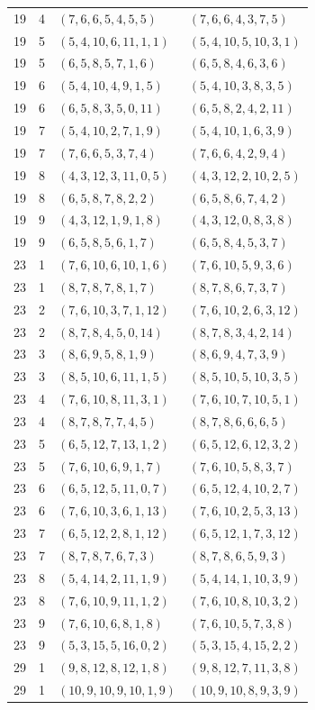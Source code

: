 \documentclass[11pt,a4paper,oneside,openany]{book}
\theoremstyle{definition}
\numberwithin{equation}{chapter}
\begin{document}
\begin{longtable}{rrll}
19&4&$(7,6,6,5,4,5,5)$&$(7,6,6,4,3,7,5)$\\
19&5&$(5,4,10,6,11,1,1)$&$(5,4,10,5,10,3,1)$\\
19&5&$(6,5,8,5,7,1,6)$&$(6,5,8,4,6,3,6)$\\
19&6&$(5,4,10,4,9,1,5)$&$(5,4,10,3,8,3,5)$\\
19&6&$(6,5,8,3,5,0,11)$&$(6,5,8,2,4,2,11)$\\
19&7&$(5,4,10,2,7,1,9)$&$(5,4,10,1,6,3,9)$\\
19&7&$(7,6,6,5,3,7,4)$&$(7,6,6,4,2,9,4)$\\
19&8&$(4,3,12,3,11,0,5)$&$(4,3,12,2,10,2,5)$\\
19&8&$(6,5,8,7,8,2,2)$&$(6,5,8,6,7,4,2)$\\
19&9&$(4,3,12,1,9,1,8)$&$(4,3,12,0,8,3,8)$\\
19&9&$(6,5,8,5,6,1,7)$&$(6,5,8,4,5,3,7)$\\
23&1&$(7,6,10,6,10,1,6)$&$(7,6,10,5,9,3,6)$\\
23&1&$(8,7,8,7,8,1,7)$&$(8,7,8,6,7,3,7)$\\
23&2&$(7,6,10,3,7,1,12)$&$(7,6,10,2,6,3,12)$\\
23&2&$(8,7,8,4,5,0,14)$&$(8,7,8,3,4,2,14)$\\
23&3&$(8,6,9,5,8,1,9)$&$(8,6,9,4,7,3,9)$\\
23&3&$(8,5,10,6,11,1,5)$&$(8,5,10,5,10,3,5)$\\
23&4&$(7,6,10,8,11,3,1)$&$(7,6,10,7,10,5,1)$\\
23&4&$(8,7,8,7,7,4,5)$&$(8,7,8,6,6,6,5)$\\
23&5&$(6,5,12,7,13,1,2)$&$(6,5,12,6,12,3,2)$\\
23&5&$(7,6,10,6,9,1,7)$&$(7,6,10,5,8,3,7)$\\
23&6&$(6,5,12,5,11,0,7)$&$(6,5,12,4,10,2,7)$\\
23&6&$(7,6,10,3,6,1,13)$&$(7,6,10,2,5,3,13)$\\
23&7&$(6,5,12,2,8,1,12)$&$(6,5,12,1,7,3,12)$\\
23&7&$(8,7,8,7,6,7,3)$&$(8,7,8,6,5,9,3)$\\
23&8&$(5,4,14,2,11,1,9)$&$(5,4,14,1,10,3,9)$\\
23&8&$(7,6,10,9,11,1,2)$&$(7,6,10,8,10,3,2)$\\
23&9&$(7,6,10,6,8,1,8)$&$(7,6,10,5,7,3,8)$\\
23&9&$(5,3,15,5,16,0,2)$&$(5,3,15,4,15,2,2)$\\
29&1&$(9,8,12,8,12,1,8)$&$(9,8,12,7,11,3,8)$\\
29&1&$(10,9,10,9,10,1,9)$&$(10,9,10,8,9,3,9)$\\

\end{longtable}
\end{document}
